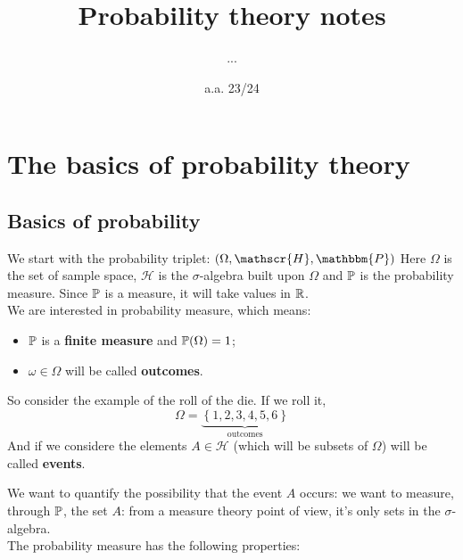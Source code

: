 \documentclass{report}
\begin{document}
	\title{Probability theory notes}
	\author{...}
	\date{a.a. 23/24}
	\maketitle
	\tableofcontents
	\chapter{The basics of probability theory}
\section{Basics of probability}
We start with the probability triplet: $(\Omega,\mathscr{H},\mathbbm{P})$ 
Here $\Omega$ is the set of sample space, $\mathscr{H}$ is the $\sigma$-algebra built upon $\Omega$ and $\mathbb{P}$ is the probability measure. Since $\mathbb{P}$ is a measure, it will take values in $\mathbb{R}$. \\
We are interested in probability measure, which means:
\begin{itemize}
	\item $\mathbb{P}$ is a \textbf{finite measure} and $\mathbb{P}(\Omega)=1$;
	\item $\omega \in\Omega$ will be called \textbf{outcomes}.
\end{itemize}
So consider the example of the roll of the die. If we roll it, 
\[\Omega=\underbrace{\left\{1,2,3,4,5,6\right\}}_{\text{outcomes}}\]
And if we considere the elements $A\in\mathscr{H}$ (which will be subsets of $\Omega$) will be called \textbf{events}.\par We want to quantify the possibility that the event $A$ occurs: we want to measure, through $\mathbb{P}$, the set $A$: from a measure theory point of view, it's only sets in the $\sigma$-algebra. \\The probability measure has the following properties:
\end{document}
